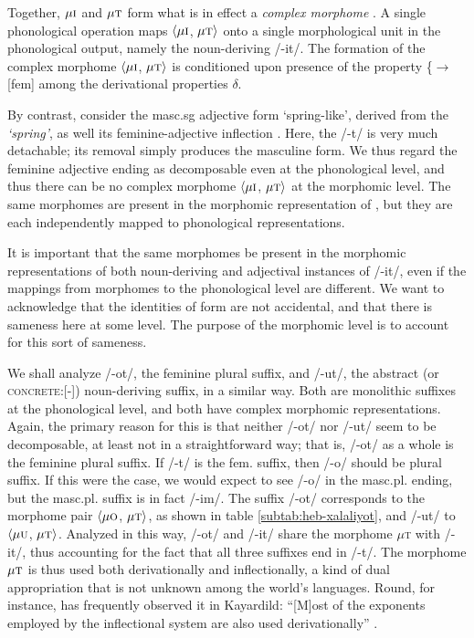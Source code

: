 Together, $\mu\textsc{i}$ and $\mu\textsc{t}$ form what is in effect  
a \emph{complex morphome} \citep{round:2015, round:md:2016}. A single 
phonological operation maps $\langle \mu\textsc{i}$, $\mu\textsc{t} \rangle$ 
onto a single morphological unit in the phonological output, namely the 
noun-deriving /-it/. The formation of the complex morphome $\langle \mu\textsc{i}$, 
$\mu\textsc{t} \rangle$ is conditioned upon presence of the 
property \{$\to$[fem] among the derivational properties $\delta$.

  By contrast, consider the masc.sg adjective form \emph{} 
  `spring-like', derived from the \emph{ `spring'}, 
  as well its feminine-adjective inflection  \emph{}. Here, the /-t/ 
  is very much detachable; its removal simply produces the masculine form. We
  thus regard the feminine adjective ending as decomposable even at the 
  phonological level, and thus there can be no complex morphome $\langle \mu\textsc{i}$, 
  $\mu\textsc{t} \rangle$ at the morphomic level. The same morphomes are present in the 
  morphomic representation of \emph{}, but they are each 
  independently mapped to phonological representations.
  
  It is important that the same morphomes be present in the morphomic 
  representations of both noun-deriving and adjectival instances of /-it/, 
  even if the mappings from morphomes to the phonological level are different. We 
  want to acknowledge that the identities of form are not accidental, 
  and that there is sameness here at some level. The purpose of the 
  morphomic level is to account for
  this sort of sameness.
  
 We shall analyze /-ot/, the feminine plural suffix, and /-ut/, the abstract (or \textsc{concrete:}[-])
 noun-deriving suffix, in a similar way. Both are monolithic suffixes at the phonological
 level, and both have complex morphomic representations. Again, the primary reason for this
 is that neither /-ot/ nor /-ut/ seem to be decomposable, at least not in a straightforward
 way; that is, /-ot/ as a whole is the feminine plural suffix. If /-t/ is the fem. suffix, then
 /-o/ should be plural suffix. If this were the case, we would expect to see
 /-o/ in the masc.pl. ending, but the masc.pl. suffix is in fact /-im/. The suffix /-ot/
 corresponds to the morphome pair $\langle \mu\textsc{o}$, $\mu\textsc{t} \rangle$, 
 as shown in table \ref{subtab:heb-xalaliyot}, and /-ut/ to $\langle \mu\textsc{u}$, 
 $\mu\textsc{t} \rangle$. Analyzed in this way, /-ot/ and /-it/ share the morphome 
 $\mu$\textsc{t} with /-it/, thus accounting for the fact that all three suffixes end 
 in /-t/. The morphome $\mu\textsc{t}$ is thus used both derivationally and 
 inflectionally, a kind of dual appropriation that is not unknown among the world's languages. 
 Round, for instance, has frequently observed it in Kayardild: ``[M]ost of the exponents 
 employed by the inflectional system are also used derivationally'' \citep[][p. 13]{round:2015}.

